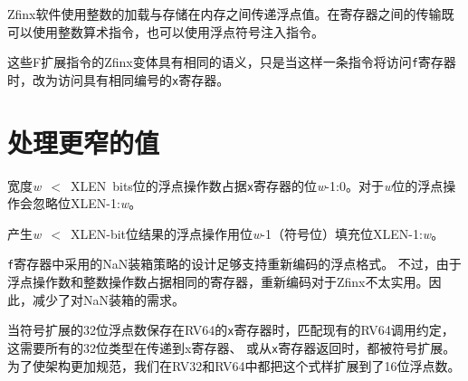 \begin{commentary}
Zfinx软件使用整数的加载与存储在内存之间传递浮点值。在寄存器之间的传输既可以使用整数算术指令，也可以使用浮点符号注入指令。
\end{commentary}

这些F扩展指令的Zfinx变体具有相同的语义，只是当这样一条指令将访问{\tt f}寄存器时，改为访问具有相同编号的{\tt x}寄存器。

\section{处理更窄的值}

宽度\mbox{{\em w} $<$ XLEN bits}位的浮点操作数占据{\tt x}寄存器的位\mbox{{\em w}-1:0}。对于{\em w}位的浮点操作会忽略位\mbox{XLEN-1:{\em w}}。

产生\mbox{{\em w} $<$ XLEN-bit}位结果的浮点操作用位\mbox{{\em w}-1}（符号位）填充位\mbox{XLEN-1:{\em w}}。

\begin{commentary}
{\tt f}寄存器中采用的NaN装箱策略的设计足够支持重新编码的浮点格式。
不过，由于浮点操作数和整数操作数占据相同的寄存器，重新编码对于Zfinx不太实用。因此，减少了对NaN装箱的需求。

当符号扩展的32位浮点数保存在RV64的{\tt x}寄存器时，匹配现有的RV64调用约定，这需要所有的32位类型在传递到x寄存器、
或从{\tt x}寄存器返回时，都被符号扩展。为了使架构更加规范，我们在RV32和RV64中都把这个式样扩展到了16位浮点数。
\end{commentary}

